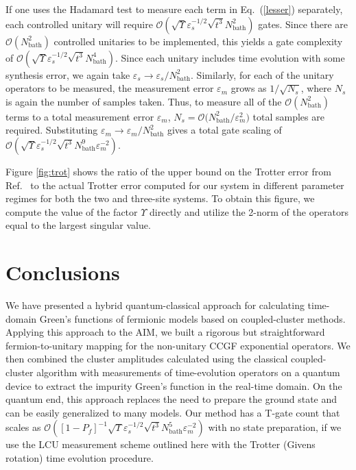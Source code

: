 \documentclass[aip,reprint,table,xcdraw,usenames,dvipsnames]{revtex4-1}
\begin{document}
If one uses the Hadamard test to measure each term in Eq.~(\ref{lesser}) separately, each controlled unitary will require $\mathcal{O}(\sqrt{\Upsilon} \varepsilon_s^{-1/2} \sqrt{t^3} N_{\text{bath}}^2)$ gates. Since there are $\mathcal{O}(N_{\text{bath}}^2)$ controlled unitaries to be implemented, this yields a gate complexity of $\mathcal{O}(\sqrt{\Upsilon} \varepsilon_s^{-1/2} \sqrt{t^3} N_{\text{bath}}^4)$. Since each unitary includes time evolution with some synthesis error, we again take $\varepsilon_s \to \varepsilon_s/N_{\text{bath}}^2$. Similarly, for each of the unitary operators to be measured, the measurement error $\varepsilon_m$ grows as $1/\sqrt{N_s}$, where $N_s$ is again the number of samples taken. Thus, to measure all of the $\mathcal{O}(N_{\text{bath}}^2)$ terms to a total measurement error $\varepsilon_m$, $N_s = \mathcal{O} \Big( N_{\text{bath}}^2/\varepsilon_m^{2} \Big)$ total samples are required. Substituting $\varepsilon_m \to \varepsilon_m/N_{\text{bath}}^2$  gives a total gate scaling of $\mathcal{O}(
\sqrt{\Upsilon} \varepsilon_s^{-1/2} \sqrt{t^3} N_{\text{bath}}^9\varepsilon_m^{-2})$.

Figure \ref{fig:trot} shows the ratio of the upper bound on the Trotter error from Ref.~ to the actual Trotter error computed for our system in different parameter regimes for both the two and three-site systems. To obtain this figure, we compute the value of the factor $\Upsilon$ directly and utilize the 2-norm of the operators equal to the largest singular value.




\section{Conclusions} \label{sec:conclusions}
%
We have presented a hybrid quantum-classical approach for calculating time-domain Green's functions of fermionic models based on coupled-cluster methods. Applying this approach to the AIM, we built a rigorous but straightforward fermion-to-unitary mapping for the non-unitary CCGF exponential operators. We then combined the cluster amplitudes calculated using the classical coupled-cluster algorithm with measurements of time-evolution operators on a quantum device to extract the impurity Green's function in the real-time domain. On the quantum end, this approach replaces the need to prepare the ground state and can be easily generalized to many models. Our method has a T-gate count that scales as $\mathcal{O}([1-P_f]^{-1} \sqrt{\Upsilon} \varepsilon_s^{-1/2} \sqrt{t^3} N_{\text{bath}}^5 \varepsilon_m^{-2})$ with no state preparation, if we use the LCU measurement scheme outlined here with the Trotter (Givens rotation) time evolution procedure. 
\end{document}
